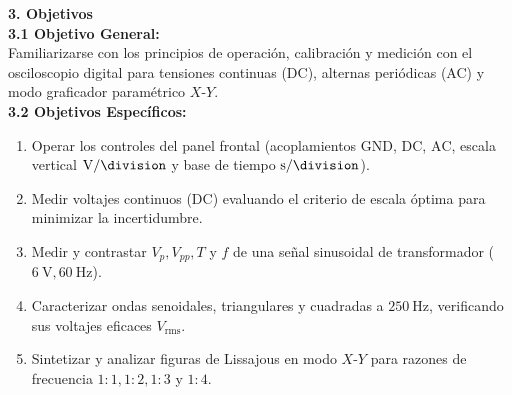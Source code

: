 \documentclass[a4paper, 11pt]{article}
\begin{document}
\begin{tcolorbox}[title=Texto a Escribir: Sección 3 (Objetivos), colframe=black]
    \small
    \textbf{\large 3. Objetivos}\\[0.15cm]
    \textbf{3.1 Objetivo General:}\\
    Familiarizarse con los principios de operación, calibración y medición con el osciloscopio digital para tensiones continuas (DC), alternas periódicas (AC) y modo graficador paramétrico $X$-$Y$.\\[0.15cm]
    \textbf{3.2 Objetivos Específicos:}
    \begin{enumerate}[leftmargin=1.5em, itemsep=1.5pt]
        \item Operar los controles del panel frontal (acoplamientos $\text{GND}$, $\text{DC}$, $\text{AC}$, escala vertical $\unit{\volt\per\division}$ y base de tiempo $\unit{\second\per\division}$).
        \item Medir voltajes continuos (DC) evaluando el criterio de escala óptima para minimizar la incertidumbre.
        \item Medir y contrastar $V_p, V_{pp}, T$ y $f$ de una señal sinusoidal de transformador ($\qty{6}{\volt}, \qty{60}{\hertz}$).
        \item Caracterizar ondas senoidales, triangulares y cuadradas a $\qty{250}{\hertz}$, verificando sus voltajes eficaces $V_{\text{rms}}$.
        \item Sintetizar y analizar figuras de Lissajous en modo $X$-$Y$ para razones de frecuencia $1:1, 1:2, 1:3$ y $1:4$.
    \end{enumerate}
\end{tcolorbox}

\newpage

\end{document}
